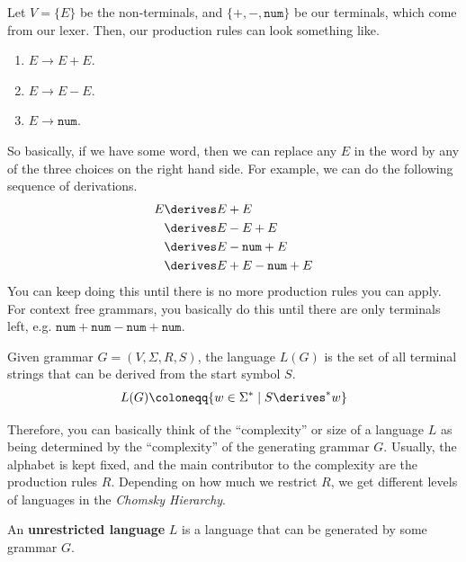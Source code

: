   \begin{example}
    Let $V = \{E\}$ be the non-terminals, and $\{+, -, \texttt{num}\}$ be our terminals, which come from our lexer. Then, our production rules can look something like. 
    \begin{enumerate}
      \item $E \to E + E$. 
      \item $E \to E - E$. 
      \item $E \to \texttt{num}$. 
    \end{enumerate}
    So basically, if we have some word, then we can replace any $E$ in the word by any of the three choices on the right hand side. For example, we can do the following sequence of derivations. 
    \begin{align}
      E & \derives E + E \\ 
        & \derives E - E + E \\
        & \derives E - \texttt{num} + E\\
        & \derives E + E - \texttt{num} + E 
    \end{align}
    You can keep doing this until there is no more production rules you can apply. For context free grammars, you basically do this until there are only terminals left, e.g. $\texttt{num} + \texttt{num} - \texttt{num} + \texttt{num}$. 
  \end{example}

  \begin{definition}
  \end{definition}

  \begin{definition}
    Given grammar $G = (V, \Sigma, R, S)$, the language $L(G)$ is the set of all terminal strings that can be derived from the start symbol $S$. 
    \begin{equation}
      L(G) \coloneqq \{ w \in \Sigma^\ast \mid S \derives^\ast w \}
    \end{equation}
  \end{definition}

  Therefore, you can basically think of the ``complexity'' or size of a language $L$ as being determined by the ``complexity'' of the generating grammar $G$. Usually, the alphabet is kept fixed, and the main contributor to the complexity are the production rules $R$. Depending on how much we restrict $R$, we get different levels of languages in the \textit{Chomsky Hierarchy}. 

  \begin{definition}[Unrestricted]
    An \textbf{unrestricted language} $L$ is a language that can be generated by some grammar $G$. 
  \end{definition}

